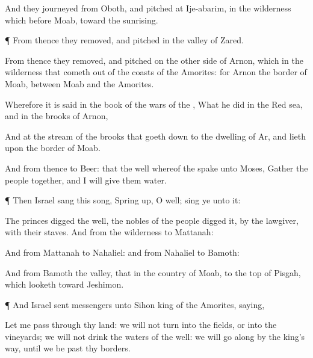 {And they
journeyed from
Oboth, and
pitched at
Ije-abarim, in the
wilderness which
{}
before
Moab, toward the
sunrising.


\par }{\PP {}¶ From thence they
removed, and
pitched in the
valley of
Zared.

From thence they
removed, and
pitched on the other
side of
Arnon, which
{} in the
wilderness that cometh
out of the
coasts of the
Amorites: for
Arnon
{} the
border of
Moab, between
Moab and the
Amorites.

Wherefore it is
said in the
book of the
wars of the
{}, What he
did in the Red
sea, and in the
brooks of
Arnon,

And at the
stream of the
brooks that goeth
down to the
dwelling of
Ar, and
lieth upon the
border of
Moab.

And from thence
{} to
Beer: that
{} the
well whereof the
{}
spake unto
Moses,
Gather the
people
together, and I will
give them
water.


\par }{\PP {}¶ Then
Israel
sang this
song, Spring
up, O
well;
sing ye unto it:

The
princes
digged the
well, the
nobles of the
people
digged it, by
{} the
lawgiver, with their
staves. And from the
wilderness
{} to
Mattanah:

And from
Mattanah to
Nahaliel: and from
Nahaliel to
Bamoth:

And from
Bamoth
{} the
valley, that
{} in the
country of
Moab, to the
top of
Pisgah, which
looketh
toward
Jeshimon.


\par }{\PP {}¶ And
Israel
sent
messengers unto
Sihon
king of the
Amorites,
saying,

Let me
pass through thy
land: we will not
turn into the
fields, or into the
vineyards; we will not
drink
{} the
waters of the
well:
{} we will go
along by the
king’s
{}
way, until we be
past thy
borders.

}
